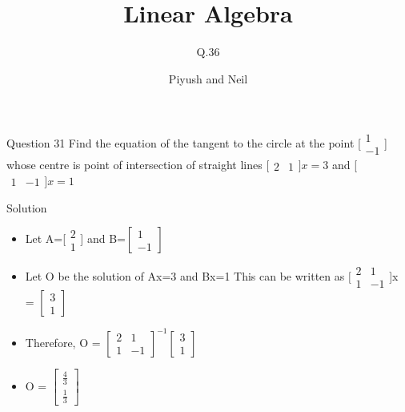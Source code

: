 \documentclass[12pt]{beamer}
\author{Piyush and Neil}
\title{Linear Algebra}
\subtitle{Q.36}
\institute{IIT Hyderabad}
\begin{document}
\begin{frame}
\titlepage
\end{frame}


\begin{frame}{Question 31}
Find the equation of the tangent to the circle at the point [$\begin{array}{c}
1 \\ 
-1
\end{array}$] whose centre is point of intersection of straight lines [$\begin{array}{cc}
2 & 1
\end{array}]x = 3$ and [$\begin{array}{cc}
1 & -1
\end{array}]x = 1$


\end{frame}

\begin{frame}{Solution}
\begin{itemize}
  \item Let A=[$\begin{array}{c}
2 \\ 
1
\end{array}$] and B=$[\begin{array}{c}
1 \\ 
-1
\end{array}]$
  \item Let O be the solution of Ax=3 and Bx=1
  This can be written as $[\begin{array}{cc}
  2 & 1 \\ 
  1 & -1
  \end{array}$]x = $[\begin{array}{c}
3 \\ 
1
\end{array}]$
\item Therefore, O = $[\begin{array}{cc}
  2 & 1 \\ 
  1 & -1
  \end{array}]^{-1}[\begin{array}{c}
3 \\ 
1
\end{array}]$
\item O = $[\begin{array}{c}
\frac{4}{3} \\ 
\frac{1}{3}
\end{array}]$
\end{itemize}


\end{frame}
\end{document}
